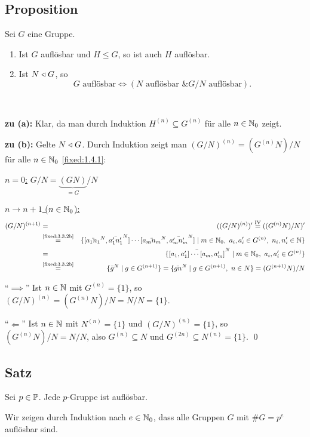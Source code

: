 \subsection{Proposition} Sei $G$ eine Gruppe.
\begin{enumerate}[label=(\alph*)]
	\item
		Ist $G$ auflösbar und $H\le G$, so ist auch $H$ auflösbar.
		
	\item
		Ist $N \normsub G$, so
		$$\text{$G$ auflösbar}\iff(\text{$N$ auflösbar} \text{ \& } \text{$G/N$ auflösbar}).$$
\end{enumerate}

\proof ~

\textbf{zu (a):} Klar, da man durch Induktion $H^{(n)}\subseteq G^{(n)}$ für alle $n\in\N_0$ zeigt.

\textbf{zu (b):} Gelte $N \normsub G$. Durch Induktion zeigt man $(G/N)^{(n)}=(G^{(n)}N)/N$ für alle $n\in\N_0$ \ref{fixed:1.4.1}:

\underline{$n=0$:} $G/N=\underbrace{(GN)}_{=G}/N$

\underline{$n\to n+1$ ($n\in\N_0$):}
\begin{eqnarray*}
	(G/N)^{(n+1)}&=&((G/N)^{(n)})'\overset{\text{IV}}=((G^{(n)}N)/N)'\\
	&\overset{\text{\ref{fixed:3.3.2b}}}=&\{[\bar{a_1n_1}^N,\bar{a_1'n_1'}^N]\dotsm[\bar{a_mn_m}^N,\bar{a_m'n_m'}^N]
	\mid m\in\N_0,~a_i,a_i'\in G^{(n)},~n_i,n_i'\in\N\}\\
	&=&\{\bar{[a_1,a_1']\cdots[a_m,a_m']}^N\mid m\in\N_0,~a_i,a_i'\in G^{(n)}\}\\
	&\overset{\text{\ref{fixed:3.3.2b}}}=&\{\bar g^N\mid g \in G^{(n+1)}\} = \{\bar{gn}^N\mid g \in G^{(n+1)},~n\in N\}=(G^{(n+1)}N)/N
\end{eqnarray*}

"`$\implies$"' Ist $n\in\N$ mit $G^{(n)}=\{1\}$, so $(G/N)^{(n)}=(G^{(n)}N)/N=N/N=\{1\}$.

"`$\Longleftarrow$"' Ist $n\in\N$ mit $N^{(n)}=\{1\}$ und $(G/N)^{(n)}=\{1\}$, so $(G^{(n)}N)/N=N/N$, also $G^{(n)}\subseteq N$ und $G^{(2n)}\subseteq N^{(n)}=\{1\}$. \qed

\subsection{Satz} Sei $p\in\P$. Jede $p$-Gruppe ist auflösbar.

\proof Wir zeigen durch Induktion nach $e\in\N_0$, dass alle Gruppen $G$ mit $\#G=p^e$ auflösbar sind.

